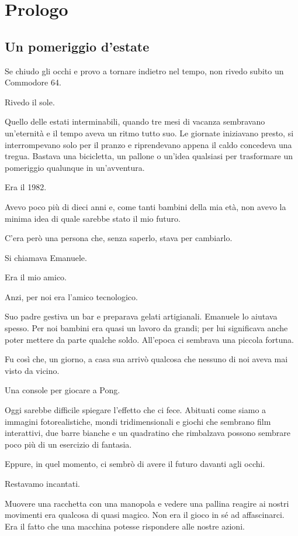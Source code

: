 \documentclass{article}
\author{HP}
\date{2026-07-26}
\begin{document}
\section{Prologo}
\subsection[Un pomeriggio d{}'estate]{Un pomeriggio d'estate}
Se chiudo gli occhi e provo a tornare indietro nel tempo, non rivedo subito un Commodore 64.

Rivedo il sole.

Quello delle estati interminabili, quando tre mesi di vacanza sembravano un'eternità e il tempo aveva un ritmo tutto
suo. Le giornate iniziavano presto, si interrompevano solo per il pranzo e riprendevano appena il caldo concedeva una
tregua. Bastava una bicicletta, un pallone o un'idea qualsiasi per trasformare un pomeriggio qualunque in un'avventura.

Era il 1982.

Avevo poco più di dieci anni e, come tanti bambini della mia età, non avevo la minima idea di quale sarebbe stato il mio
futuro.

C'era però una persona che, senza saperlo, stava per cambiarlo.

Si chiamava Emanuele.

Era il mio amico.

Anzi, per noi era l'amico tecnologico.

Suo padre gestiva un bar e preparava gelati artigianali. Emanuele lo aiutava spesso. Per noi bambini era quasi un lavoro
da grandi; per lui significava anche poter mettere da parte qualche soldo. All'epoca ci sembrava una piccola fortuna.

Fu così che, un giorno, a casa sua arrivò qualcosa che nessuno di noi aveva mai visto da vicino.

Una console per giocare a Pong.

Oggi sarebbe difficile spiegare l'effetto che ci fece. Abituati come siamo a immagini fotorealistiche, mondi
tridimensionali e giochi che sembrano film interattivi, due barre bianche e un quadratino che rimbalzava possono
sembrare poco più di un esercizio di fantasia.

Eppure, in quel momento, ci sembrò di avere il futuro davanti agli occhi.

Restavamo incantati.

Muovere una racchetta con una manopola e vedere una pallina reagire ai nostri movimenti era qualcosa di quasi magico.
Non era il gioco in sé ad affascinarci. Era il fatto che una macchina potesse rispondere alle nostre azioni.
\end{document}
